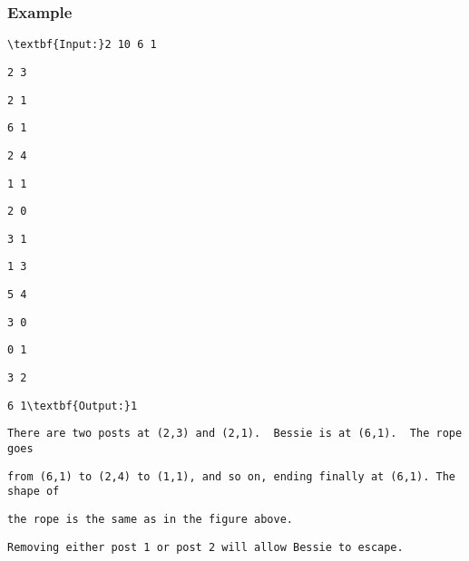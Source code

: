 \subsubsection{Example}
\begin{verbatim}
\textbf{Input:}2 10 6 1 \end{verbatim}
\begin{verbatim}
2 3 \end{verbatim}
\begin{verbatim}
2 1 \end{verbatim}
\begin{verbatim}
6 1 \end{verbatim}
\begin{verbatim}
2 4 \end{verbatim}
\begin{verbatim}
1 1 \end{verbatim}
\begin{verbatim}
2 0 \end{verbatim}
\begin{verbatim}
3 1 \end{verbatim}
\begin{verbatim}
1 3 \end{verbatim}
\begin{verbatim}
5 4 \end{verbatim}
\begin{verbatim}
3 0 \end{verbatim}
\begin{verbatim}
0 1 \end{verbatim}
\begin{verbatim}
3 2 \end{verbatim}
\begin{verbatim}
6 1\textbf{Output:}1\end{verbatim}
\begin{verbatim}
There are two posts at (2,3) and (2,1).  Bessie is at (6,1).  The rope goes \end{verbatim}
\begin{verbatim}
from (6,1) to (2,4) to (1,1), and so on, ending finally at (6,1). The shape of \end{verbatim}
\begin{verbatim}
the rope is the same as in the figure above.\end{verbatim}
\begin{verbatim}
Removing either post 1 or post 2 will allow Bessie to escape.\end{verbatim}